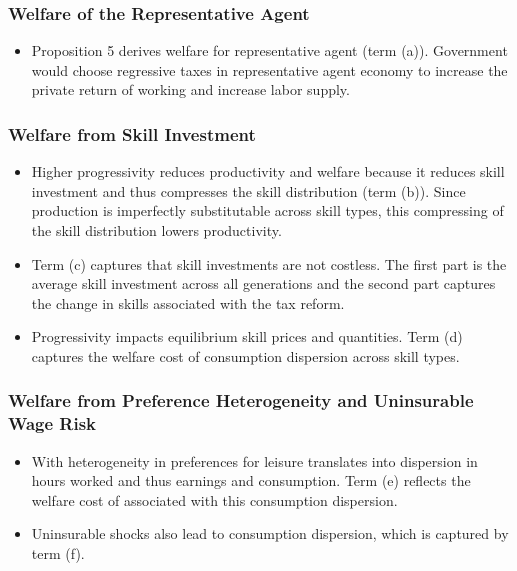 \documentclass{article}
\begin{document}
\subsubsection{Welfare of the Representative Agent}

\begin{itemize}
\item Proposition 5 derives welfare for representative agent (term (a)). Government would choose regressive taxes in representative agent economy to increase the private return of working and increase labor supply.
\end{itemize}

\subsubsection{Welfare from Skill Investment}

\begin{itemize}
\item Higher progressivity reduces productivity and welfare because it reduces skill investment and thus compresses the skill distribution (term (b)). Since production is imperfectly substitutable across skill types, this compressing of the skill distribution lowers productivity.
\item Term (c) captures that skill investments are not costless. The first part is the average skill investment across all generations and the second part captures the change in skills associated with the tax reform.
\item Progressivity impacts equilibrium skill prices and quantities. Term (d) captures the welfare cost of consumption dispersion across skill types.
\end{itemize}

\subsubsection{Welfare from Preference Heterogeneity and Uninsurable Wage Risk}

\begin{itemize}
\item With heterogeneity in preferences for leisure translates into dispersion in hours worked and thus earnings and consumption. Term (e) reflects the welfare cost of associated with this consumption dispersion.
\item Uninsurable shocks also lead to consumption dispersion, which is captured by term (f).
\end{itemize}
\end{document}
